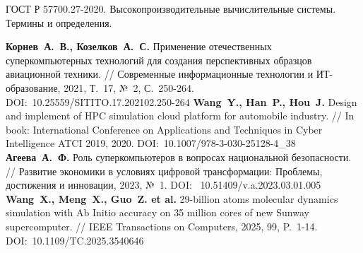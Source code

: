 \newpage
\renewcommand{\baselinestretch}{1.0}
\begin{thebibliography}{99}
\setlength{\itemsep}{0pt}


ГОСТ Р 57700.27-2020. Высокопроизводительные вычислительные системы. Термины и определения.

\textbf{Корнев~А.~В., Козелков~А.~С.} Применение отечественных суперкомпьютерных технологий для создания перспективных образцов авиационной техники. // Современные информационные технологии и ИТ-образование, 2021, Т.~17, №~2, С.~250-264. DOI:~10.25559/SITITO.17.202102.250-264
\textbf{Wang~Y., Han~P., Hou~J.} Design and implement of HPC simulation cloud platform for automobile industry. // In book: International Conference on Applications and Techniques in Cyber Intelligence ATCI 2019, 2020. DOI:~10.1007/978-3-030-25128-4\_38
\textbf{Агеева~А.~Ф.} Роль суперкомпьютеров в вопросах национальной безопасности. // Развитие экономики в условиях цифровой трансформации: Проблемы, достижения и инновации, 2023, №~1. DOI:~ 10.51409/v.a.2023.03.01.005
\textbf{Wang~X., Meng~X., Guo~Z. et al.} 29-billion atoms molecular dynamics simulation with Ab Initio accuracy on 35 million cores of new Sunway supercomputer. // IEEE Transactions on Computers, 2025, 99, P.~1-14. DOI:~10.1109/TC.2025.3540646


\end{thebibliography}
